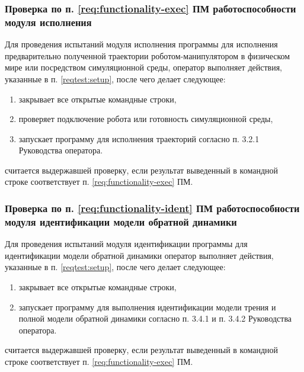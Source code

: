 \subsubsection{Проверка по п. \ref{req:functionality-exec} ПМ работоспособности модуля исполнения} \label{reqtest:functionality-exec}
Для проведения испытаний модуля исполнения программы \productname для исполнения предварительно полученной траектории роботом-манипулятором в физическом мире или посредством симуляционной среды, оператор выполняет действия, указанные в п. \ref{reqtest:setup}, после чего делает следующее:
\begin{enumerate}
    \item закрывает все открытые командные строки,
    \item проверяет подключение робота или готовность симуляционной среды,
    \item запускает программу для исполнения траекторий согласно п. 3.2.1 Руководства оператора.
\end{enumerate}
\programname считается выдержавшей проверку, если результат выведенный в командной строке соответствует п. \ref{req:functionality-exec} ПМ.

\subsubsection{Проверка по п. \ref{req:functionality-ident} ПМ  работоспособности модуля идентификации модели обратной динамики} \label{reqtest:functionality-ident}
Для проведения испытаний модуля идентификации программы \productname для идентификации модели обратной динамики оператор выполняет действия, указанные в п. \ref{reqtest:setup}, после чего делает следующее:
\begin{enumerate}
    \item закрывает все открытые командные строки,
    \item запускает программу для выполнения идентификации модели трения и полной модели обратной динамики согласно п. 3.4.1 и п. 3.4.2 Руководства оператора.
\end{enumerate}
\programname считается выдержавшей проверку, если результат выведенный в командной строке соответствует п. \ref{req:functionality-exec} ПМ.

